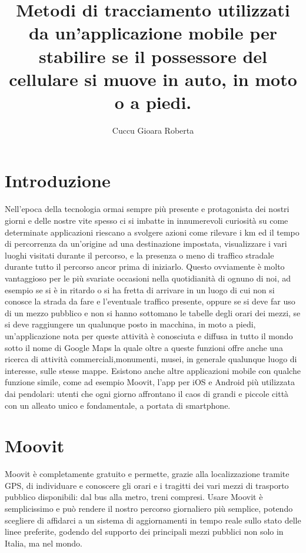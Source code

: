 \documentclass[]{scrartcl}
\title{Metodi di tracciamento utilizzati da un’applicazione mobile per stabilire se il possessore del cellulare si muove in auto, in moto o a piedi.}
\author{Cuccu Gioara Roberta}
\begin{document}
\maketitle
\newpage
\tableofcontents
\newpage
\section{Introduzione}
Nell'epoca della tecnologia ormai sempre più presente e protagonista dei nostri giorni e delle nostre vite spesso ci si imbatte in innumerevoli curiosità su come determinate applicazioni riescano a svolgere azioni come rilevare i km ed il tempo di percorrenza da un’origine ad una destinazione impostata, visualizzare i vari luoghi visitati durante il percorso, e la presenza o meno di traffico stradale durante tutto il percorso ancor prima di iniziarlo. 
Questo ovviamente è molto vantaggioso per le più svariate occasioni nella quotidianità di ognuno di noi, ad esempio se si è in ritardo o si ha fretta di arrivare in un luogo di cui non si conosce la strada da fare e l’eventuale traffico presente, oppure se si deve far uso di un mezzo pubblico e non si hanno sottomano le tabelle degli orari dei mezzi, se si deve raggiungere un qualunque posto in macchina, in moto a piedi, un’applicazione nota per queste attività è conosciuta e diffusa in tutto il mondo sotto il nome di Google Maps la quale oltre a queste funzioni offre anche una ricerca di attività commerciali,monumenti, musei, in generale qualunque luogo di interesse, sulle stesse mappe.
Esistono anche altre applicazioni mobile con qualche funzione simile, come ad esempio Moovit, l’app per iOS e Android più utilizzata dai pendolari: utenti che ogni giorno affrontano il caos di grandi e piccole città con un alleato unico e fondamentale, a portata di smartphone. 
\section{Moovit}
Moovit è completamente gratuito e permette, grazie alla localizzazione tramite GPS, di individuare e conoscere gli orari e i tragitti dei vari mezzi di trasporto pubblico disponibili: dal bus alla metro, treni compresi.
Usare Moovit è semplicissimo e può rendere il nostro percorso giornaliero più semplice, potendo scegliere di affidarci a un sistema di aggiornamenti in tempo reale sullo stato delle linee preferite, godendo del supporto dei principali mezzi pubblici non solo in Italia, ma nel mondo.
\end{document}
